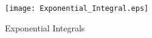 \documentclass[12pt,a4paper,titlepage]{jarticle}
\begin{document}
\title{}
\author{A4SB2121 Yusa Shusaku}
\date{}

\begin{figure}[h]
\begin{center}
\texttt{[image: Exponential\_Integral.eps]}
\caption{Exponential Integrals}
\end{center}
\end{figure}
\end{document}
